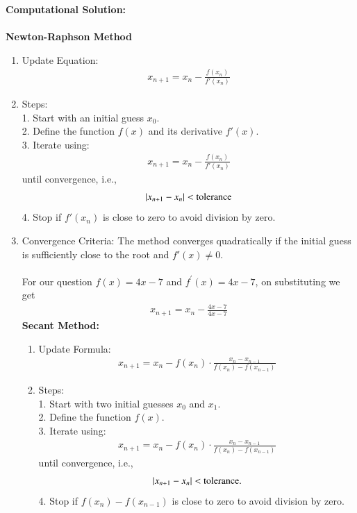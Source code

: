\documentclass[journal]{IEEEtran}
\begin{document}
\textbf{Computational Solution: }\\ \\
\textbf{Newton-Raphson Method}
\begin{enumerate}
\item Update Equation:
\begin{align}
 x_{n+1} = x_n - \frac{f(x_n)}{f'(x_n)}   
\end{align}

\item Steps:\\
1. Start with an initial guess $ x_0 $.\\
2. Define the function \( f(x) \) and its derivative  $f'(x)$.\\
3. Iterate using:
   \begin{align}
   x_{n+1} = x_n - \frac{f(x_n)}{f'(x_n)}
   \end{align}
   until convergence, i.e.,
   \begin{align}
   \left\vert x_{n+1} - x_n\right\vert < \text{tolerance}
   \end{align}
4. Stop if $f'(x_n)$ is close to zero to avoid division by zero.

\item Convergence Criteria:
The method converges quadratically if the initial guess is sufficiently close to the root and  $f'(x) \neq 0 $.\\ \\
For our  question $f(x) =  4x - 7 $ and $f^{\prime}(x) = 4x - 7$, on substituting we get
\begin{align}
    x_{n+1} = x_n - \frac{ 4x - 7}{ 4x - 7}
\end{align}
\textbf{Secant Method:}
\begin{enumerate}
\item{Update Formula:}
\begin{align}
x_{n+1} = x_n - f(x_n) \cdot \frac{x_n - x_{n-1}}{f(x_n) - f(x_{n-1})}    
\end{align}


\item{Steps:}\\
1. Start with two initial guesses $x_0$  and $x_1$.\\
2. Define the function $f(x)$.\\
3. Iterate using:
   \begin{align}
   x_{n+1} = x_n - f(x_n) \cdot \frac{x_n - x_{n-1}}{f(x_n) - f(x_{n-1})}    
   \end{align}
   until convergence, i.e.,
   \begin{align}
   \left\vert x_{n+1} - x_n\right\vert < \text{tolerance}.
   \end{align}
4. Stop if $ f(x_n) - f(x_{n-1}) $ is close to zero to avoid division by zero.


\end{enumerate}
\end{enumerate}
\end{document}
